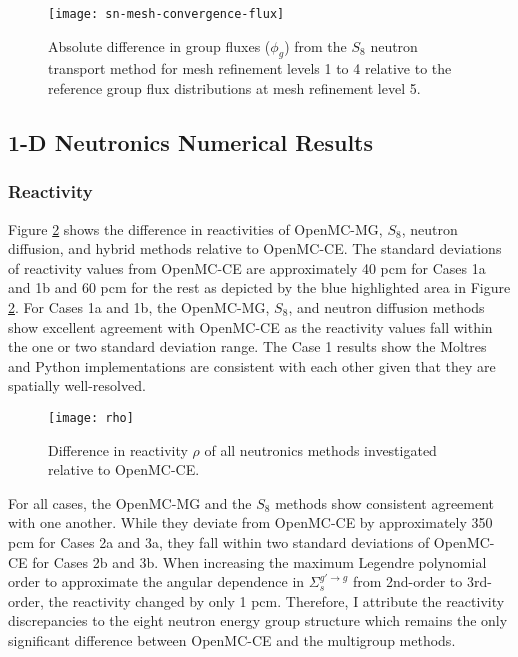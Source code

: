 \begin{figure}[htb!]
  \centering
  \texttt{[image: sn-mesh-convergence-flux]}
  \caption{Absolute difference in group fluxes ($\phi_g$) from the $S_8$ neutron transport method
  for mesh refinement levels 1 to 4 relative to the reference group flux distributions at mesh
  refinement level 5.}
  \label{fig:sn-mesh-flux}
\end{figure}

\FloatBarrier

\subsection{1-D Neutronics Numerical Results}

\subsubsection{Reactivity}

Figure \ref{fig:1d-rho} shows the difference in reactivities of OpenMC-MG, $S_8$,
neutron diffusion, and hybrid methods relative to OpenMC-CE. The standard deviations of
reactivity values from OpenMC-CE are approximately 40 pcm for Cases 1a and 1b and 60 pcm for the
rest as depicted by the blue highlighted area in Figure \ref{fig:1d-rho}. For Cases 1a and 1b, the
OpenMC-MG, $S_8$, and neutron diffusion methods show excellent agreement with OpenMC-CE as the
reactivity values fall within the one or two standard deviation range. The Case 1 results show
the Moltres and Python implementations are consistent with each other given that they are spatially
well-resolved.

\begin{figure}[htb!]
  \centering
  \texttt{[image: rho]}
  \caption{Difference in reactivity $\rho$ of all neutronics methods investigated relative
  to OpenMC-CE.}
  \label{fig:1d-rho}
\end{figure}

For all cases, the OpenMC-MG and the $S_8$ methods show consistent agreement with one another. 
While they deviate from OpenMC-CE by approximately 350 pcm for Cases 2a and 3a, they fall within
two standard deviations of OpenMC-CE for Cases 2b and 3b. When increasing the maximum Legendre
polynomial order to approximate the angular dependence in $\Sigma_s^{g'\rightarrow g}$ from
2nd-order to 3rd-order, the reactivity changed by only 1 pcm. Therefore, I attribute the reactivity
discrepancies to the eight neutron energy group structure which remains the
only significant difference between OpenMC-CE and the multigroup methods.

